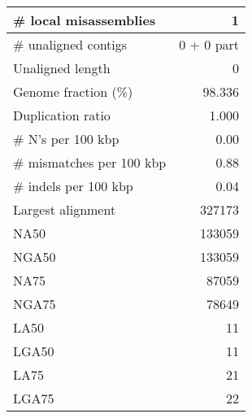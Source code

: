 \documentclass[12pt,a4paper]{article}
\begin{document}
\begin{table}[ht]
\begin{center}
\begin{tabular}{|l*{1}{|r}|}
\# local misassemblies & 1 \\ \hline
\# unaligned contigs & 0 + 0 part \\ \hline
Unaligned length & 0 \\ \hline
Genome fraction (\%) & 98.336 \\ \hline
Duplication ratio & 1.000 \\ \hline
\# N's per 100 kbp & 0.00 \\ \hline
\# mismatches per 100 kbp & 0.88 \\ \hline
\# indels per 100 kbp & 0.04 \\ \hline
Largest alignment & 327173 \\ \hline
NA50 & 133059 \\ \hline
NGA50 & 133059 \\ \hline
NA75 & 87059 \\ \hline
NGA75 & 78649 \\ \hline
LA50 & 11 \\ \hline
LGA50 & 11 \\ \hline
LA75 & 21 \\ \hline
LGA75 & 22 \\ \hline
\end{tabular}
\end{center}
\end{table}
\end{document}
